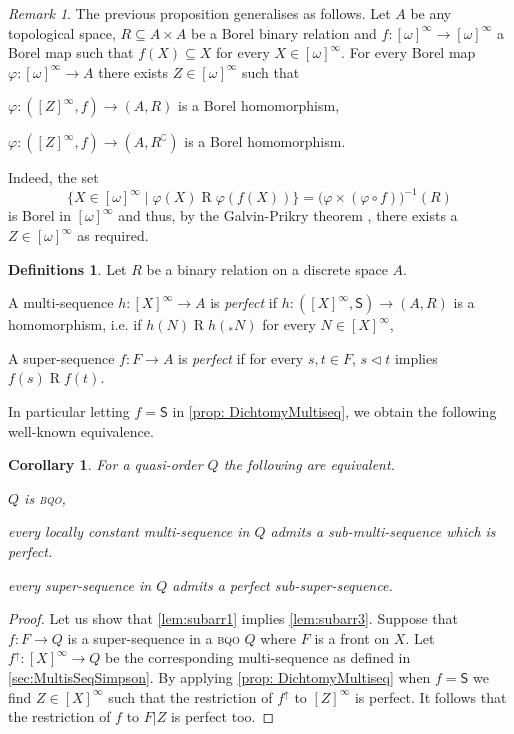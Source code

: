 \documentclass{article}%
\theoremstyle{plain}
\newtheorem{corollary}[theorem]{Corollary}
\theoremstyle{definition}
\newtheorem{definition}[theorem]{Definition}
\newtheorem{definition}[theorem]{Notation}
\newtheorem{definition}[theorem]{Notations}
\newtheorem{definition}[theorem]{Definitions}
\theoremstyle{remark}
\newtheorem{remark}[theorem]{Remark}
\newcommand{\bqo}{\textsc{bqo}}
\DeclareMathOperator{\upcl}{\uparrow}
\newcommand{\tri} {\mathrel{\lhd}}
\newcommand{\shift}[1]{{}_{*}#1}
\newcommand{\SHIFT}{\mathsf{S}}
\newcommand{\infSub}[1]{[#1]^{\infty}}
\begin{document}
\begin{remark}
The previous proposition generalises as follows. Let $A$ be any topological space, $R\subseteq A\times A$ be a Borel binary relation and $f:\infSub{\omega}\to\infSub{\omega}$ a Borel map such that $f(X)\subseteq X$ for every $X\in\infSub{\omega}$. For every Borel map $\varphi:\infSub{\omega}\to A$ there exists $Z\in\infSub{\omega}$ such that
\begin{descThm}
\item[either] $\varphi: (\infSub{Z}, f)\to (A,R)$ is a Borel homomorphism,
\item[or] $\varphi:(\infSub{Z},f)\to (A,R^{\complement})$ is a Borel homomorphism.
\end{descThm}
Indeed, the set
\[
\{X\in\infSub{\omega}\mid \varphi(X)\mathrel{R}\varphi(f(X))\}=\big(\varphi\times(\varphi \circ f)\big)^{-1}(R)
\]
is Borel in $\infSub{\omega}$ and thus, by the Galvin-Prikry theorem \cite{JSL:9194679}, there exists a $Z\in\infSub{\omega}$ as required.
\end{remark}


\begin{definition}
Let $R$ be a binary relation on a discrete space $A$.
\begin{enumDefn}
\item A multi-sequence $h:\infSub{X}\to A$ is \emph{perfect} if $h:(\infSub{X},\SHIFT)\to (A,R)$ is a homomorphism, i.e. if $h(N)\mathrel{R} h(\shift{N})$ for every $N\in\infSub{X}$, 
\item A super-sequence $f:F\to A$ is \emph{perfect} if for every $s,t\in F$, $s\tri t$ implies $f(s)\mathrel{R} f(t)$.
\end{enumDefn}
\end{definition}


In particular letting $f=\SHIFT$ in \cref{prop: DichtomyMultiseq}, we obtain the following well-known equivalence.
\begin{corollary}\label{lem:subarr}
For a quasi-order $Q$ the following are equivalent.
\begin{enumThm}
\item $Q$ is \bqo{}, \label{lem:subarr1}
\item every locally constant multi-sequence in $Q$  admits a sub-multi-sequence which is perfect. \label{lem:subarr2}
\item every super-sequence in $Q$ admits a perfect sub-super-sequence. \label{lem:subarr3}
\end{enumThm}
\end{corollary}
\begin{proof}
Let us show that \cref{lem:subarr1} implies \cref{lem:subarr3}. Suppose that $f:F\to Q$ is a super-sequence in a \bqo{} $Q$ where $F$ is a front on $X$. Let $f^{\upcl}:\infSub{X}\to Q$ be the corresponding multi-sequence as defined in \cref{sec:MultisSeqSimpson}. By applying \cref{prop: DichtomyMultiseq} when $f=\SHIFT$ we find $Z\in\infSub{X}$ such that the restriction of $f^{\upcl}$ to $\infSub{Z}$ is perfect. It follows that the restriction of $f$ to $F|Z$ is perfect too.
\end{proof}
\end{document}
